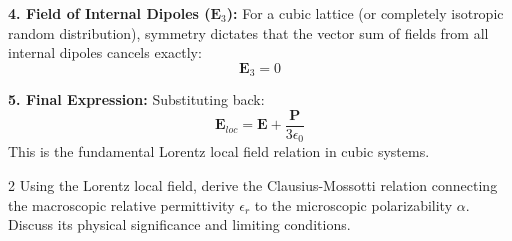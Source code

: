 \begin{theorysol}
\textbf{4. Field of Internal Dipoles ($\mathbf{E}_3$):}
For a cubic lattice (or completely isotropic random distribution), symmetry dictates that the vector sum of fields from all internal dipoles cancels exactly:
\begin{equation}
\mathbf{E}_3 = 0
\end{equation}

\textbf{5. Final Expression:}
Substituting back:
\begin{equation}
\mathbf{E}_{loc} = \mathbf{E} + \frac{\mathbf{P}}{3\epsilon_0}
\end{equation}
This is the fundamental Lorentz local field relation in cubic systems.
\end{theorysol}
\vspace{4mm}

\begin{theoryq}{2}
Using the Lorentz local field, derive the Clausius-Mossotti relation connecting the macroscopic relative permittivity $\epsilon_r$ to the microscopic polarizability $\alpha$. Discuss its physical significance and limiting conditions.
\end{theoryq}
